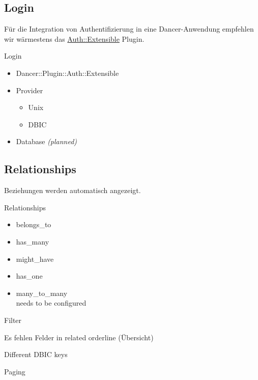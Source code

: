 \subsection{Login}

Für die Integration von Authentifizierung in eine Dancer-Anwendung empfehlen
wir wärmestens das
\href{https://metacpan.org/pod/Dancer::Plugin::Auth::Extensible}{Auth::Extensible}
Plugin.

\begin{frame}{Login}
\begin{itemize}
\item Dancer::Plugin::Auth::Extensible
\item Provider
\begin{itemize}
\item Unix
\item DBIC
\end{itemize}
\item Database \textit{(planned)}
\end{itemize}
\end{frame}

\subsection{Relationships}

Beziehungen werden automatisch angezeigt.

\begin{frame}{Relationships}
\begin{itemize}
\item belongs\_to
\item has\_many
\item might\_have
\item has\_one
\item many\_to\_many \\
      needs to be configured
\end{itemize}
\end{frame}

Filter

Es fehlen Felder in related orderline (Übersicht)

Different DBIC keys

Paging


